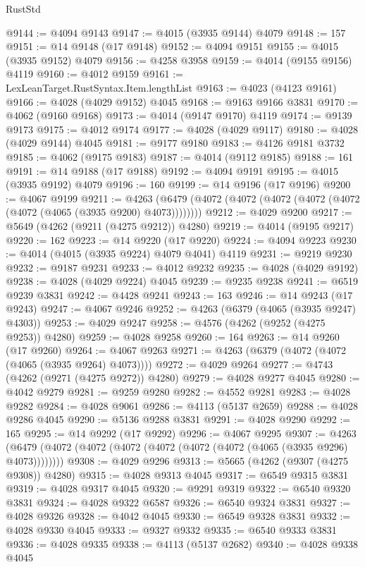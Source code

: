 \begin{lexlean}{RustStd}
\begin{coremodule}
@9144 := @4094 @9143
@9147 := @4015 (@3935 @9144) @4079
@9148 := 157
@9151 := @14 @9148 (@17 @9148)
@9152 := @4094 @9151
@9155 := @4015 (@3935 @9152) @4079
@9156 := @4258 @3958
@9159 := @4014 (@9155 @9156) @4119
@9160 := @4012 @9159
@9161 := LexLeanTarget.RustSyntax.Item.lengthList
@9163 := @4023 (@4123 @9161)
@9166 := @4028 (@4029 @9152) @4045
@9168 := @9163 @9166 @3831
@9170 := @4062 (@9160 @9168)
@9173 := @4014 (@9147 @9170) @4119
@9174 := @9139 @9173
@9175 := @4012 @9174
@9177 := @4028 (@4029 @9117)
@9180 := @4028 (@4029 @9144) @4045
@9181 := @9177 @9180
@9183 := @4126 @9181 @3732
@9185 := @4062 (@9175 @9183)
@9187 := @4014 (@9112 @9185)
@9188 := 161
@9191 := @14 @9188 (@17 @9188)
@9192 := @4094 @9191
@9195 := @4015 (@3935 @9192) @4079
@9196 := 160
@9199 := @14 @9196 (@17 @9196)
@9200 := @4067 @9199
@9211 := @4263 (@6479 (@4072 (@4072 (@4072 (@4072 (@4072 (@4072 (@4065 (@3935 @9200) @4073))))))))
@9212 := @4029 @9200
@9217 := @5649 (@4262 (@9211 (@4275 @9212)) @4280)
@9219 := @4014 (@9195 @9217)
@9220 := 162
@9223 := @14 @9220 (@17 @9220)
@9224 := @4094 @9223
@9230 := @4014 (@4015 (@3935 @9224) @4079 @4041) @4119
@9231 := @9219 @9230
@9232 := @9187 @9231
@9233 := @4012 @9232
@9235 := @4028 (@4029 @9192)
@9238 := @4028 (@4029 @9224) @4045
@9239 := @9235 @9238
@9241 := @6519 @9239 @3831
@9242 := @4428 @9241
@9243 := 163
@9246 := @14 @9243 (@17 @9243)
@9247 := @4067 @9246
@9252 := @4263 (@6379 (@4065 (@3935 @9247) @4303))
@9253 := @4029 @9247
@9258 := @4576 (@4262 (@9252 (@4275 @9253)) @4280)
@9259 := @4028 @9258
@9260 := 164
@9263 := @14 @9260 (@17 @9260)
@9264 := @4067 @9263
@9271 := @4263 (@6379 (@4072 (@4072 (@4065 (@3935 @9264) @4073))))
@9272 := @4029 @9264
@9277 := @4743 (@4262 (@9271 (@4275 @9272)) @4280)
@9279 := @4028 @9277 @4045
@9280 := @4042 @9279
@9281 := @9259 @9280
@9282 := @4552 @9281
@9283 := @4028 @9282
@9284 := @4028 @9061
@9286 := @4113 (@5137 @2659)
@9288 := @4028 @9286 @4045
@9290 := @5136 @9288 @3831
@9291 := @4028 @9290
@9292 := 165
@9295 := @14 @9292 (@17 @9292)
@9296 := @4067 @9295
@9307 := @4263 (@6479 (@4072 (@4072 (@4072 (@4072 (@4072 (@4072 (@4065 (@3935 @9296) @4073))))))))
@9308 := @4029 @9296
@9313 := @5665 (@4262 (@9307 (@4275 @9308)) @4280)
@9315 := @4028 @9313 @4045
@9317 := @6549 @9315 @3831
@9319 := @4028 @9317 @4045
@9320 := @9291 @9319
@9322 := @6540 @9320 @3831
@9324 := @4028 @9322 @6587
@9326 := @6540 @9324 @3831
@9327 := @4028 @9326
@9328 := @4042 @4045
@9330 := @6549 @9328 @3831
@9332 := @4028 @9330 @4045
@9333 := @9327 @9332
@9335 := @6540 @9333 @3831
@9336 := @4028 @9335
@9338 := @4113 (@5137 @2682)
@9340 := @4028 @9338 @4045

\end{coremodule}
\end{lexlean}
